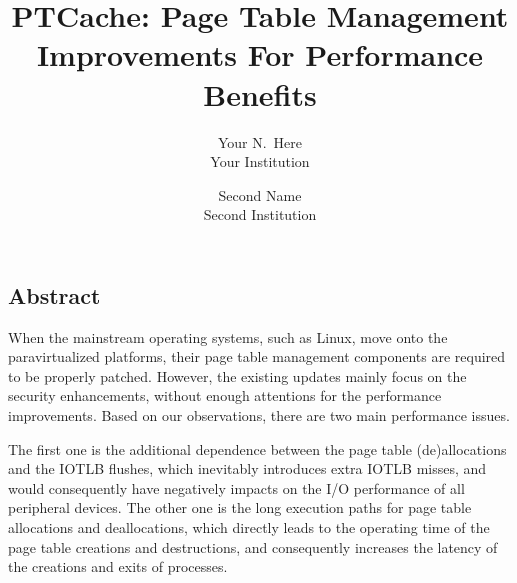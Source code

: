 \documentclass[letterpaper,twocolumn,10pt]{article}
\begin{document}
\newcommand{\name}{PTCache\xspace}
\newcommand{\eat}[1]{}  %
\newcommand{\authcomment}[3]{\textcolor{#3}{#1 says: #2}}\newcommand{\yueqiang}[1]{\authcomment{Yueqiang}{#1}{red}}
\newcommand{\zhi}[1]{\authcomment{Zhi}{#1}{red}}



\date{}

\title{\Large \bf PTCache: Page Table Management Improvements For Performance Benefits }

\author{
{\rm Your N.\ Here}\\
Your Institution
\and
{\rm Second Name}\\
Second Institution
} %

\maketitle

\thispagestyle{empty}


\subsection*{Abstract}
When the mainstream operating systems, such as Linux, move onto the paravirtualized platforms, their page table management components are required to be properly patched.
However, the existing updates mainly focus on the security enhancements, without enough attentions for the performance improvements.
Based on our observations, there are two main performance issues.

The first one is the additional dependence between the page table (de)allocations and the IOTLB flushes, which inevitably introduces extra IOTLB misses, and would consequently have negatively impacts on the I/O performance of all peripheral devices.
The other one is the long execution paths for page table allocations and deallocations, which directly leads to the operating time of the page table creations and destructions, and consequently increases the latency of the creations and exits of processes.
\end{document}
